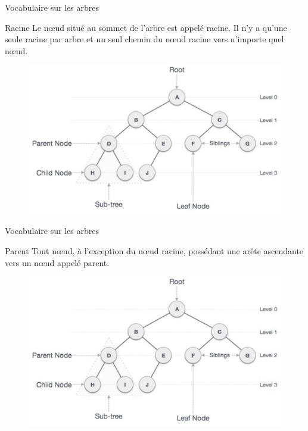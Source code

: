 \documentclass[10pt,xcolor=dvipsnames]{beamer}
\newcommand{\defin}[1]{\textcolor{darkspringgreen}{#1}}
\begin{document}
\begin{frame}{Vocabulaire sur les arbres}
    \begin{exampleblock}{Racine}
     Le nœud situé au sommet de l'arbre est appelé \defin{racine}. Il n'y a qu'une seule racine par arbre et un seul chemin du nœud racine vers n'importe quel nœud.
    \end{exampleblock}
    
    \begin{figure}
    \centering
    \includegraphics[scale=0.2]{figures/CM2/ABR-1.png}
    \label{fig:my_label}
\end{figure}
\end{frame}

\begin{frame}{Vocabulaire sur les arbres}
    \begin{exampleblock}{Parent}
    Tout nœud, à l'exception du nœud racine, possédant une arête ascendante vers un nœud appelé \defin{parent}.
    \end{exampleblock}
    
    \begin{figure}
    \centering
    \includegraphics[scale=0.2]{figures/CM2/ABR-1.png}
    \label{fig:my_label}
\end{figure}
\end{frame}
\end{document}
